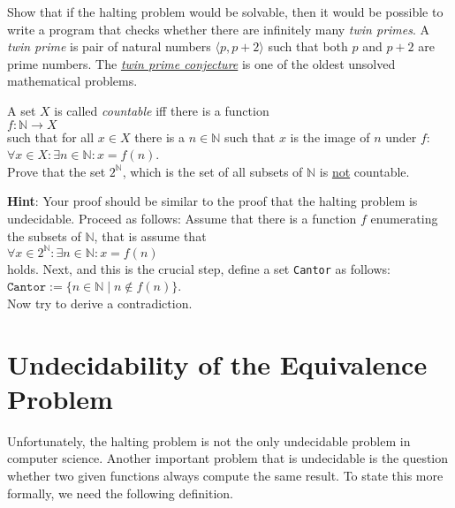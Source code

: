 \exercise
Show that if the halting problem would be solvable, then it would be possible to write a program that checks
whether there are infinitely many \emph{twin primes}.  A \emph{twin prime} is pair of natural numbers
$\langle p, p + 2 \rangle$ such that both $p$ and $p+2$ are prime numbers.  
The \href{http://en.wikipedia.org/wiki/Twin_prime_conjecture}{\emph{twin prime conjecture}} is one
of the oldest unsolved mathematical problems.

\exercise
A set $X$ is called \emph{countable}  iff there is a function 
\\[0.2cm]
\hspace*{1.3cm}
 $f: \mathbb{N} \rightarrow X$ 
\\[0.2cm]
such that for all $x\in X$ there is a $n \in \mathbb{N}$ such that $x$ is the image of
$n$ under $f$: 
\\[0.2cm]
\hspace*{1.3cm} $\forall x \in X: \exists n \in \mathbb{N}: x = f(n)$.
\\[0.2cm]
Prove that the set $2^\mathbb{N}$, which is the set of all subsets of $\mathbb{N}$ is \underline{not} countable. 

\vspace*{0.2cm}

\noindent
\textbf{Hint}:  Your proof should be similar to the proof that the halting problem is undecidable. 
Proceed as follows:
Assume that there is a function $f$ enumerating the subsets of $\mathbb{N}$, that is assume that 
\\[0.2cm]
\hspace*{1.3cm}
$\forall x \in 2^\mathbb{N}: \exists n \in \mathbb{N}: x = f(n)$
\\[0.2cm]
holds.  Next, and this is the crucial step, define a set \texttt{Cantor} as follows:
\\[0.2cm]
\hspace*{1.3cm} $\mathtt{Cantor} := \bigl\{ n \in \mathbb{N} \mid n \notin f(n) \bigr\}$.
\\[0.2cm]
Now try to derive a contradiction.  



\section[The Equivalence Problem]{Undecidability of the Equivalence Problem}
Unfortunately, the halting problem is not the only undecidable problem in computer science.  Another
important problem that is undecidable is the question whether two given functions always compute the
same result.  To state this more formally, we need the following definition.


